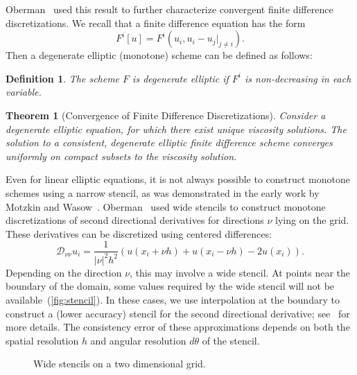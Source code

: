 \documentclass{amsart}
\newtheorem{theorem}{Theorem}
\theoremstyle{lemma}
\newtheorem{definition}{Definition}
\theoremstyle{remark}
\begin{document}
Oberman~\cite{ObermanSINUM} used this result to further characterize convergent finite difference discretizations.
We recall that a finite difference equation has the form
\[ F^i[u] = F^i(u_i,u_i-u_j|_{j \neq i}). \]
Then a degenerate elliptic (monotone) scheme can be defined as follows:
\begin{definition}\label{def:deg}
The scheme $F$ is \emph{degenerate elliptic} if $F^i$ is non-decreasing in each variable.
\end{definition}
\begin{theorem}[Convergence of Finite Difference Discretizations]
Consider a degenerate elliptic equation, for which there exist unique viscosity solutions.  The solution to a consistent, degenerate elliptic finite difference scheme converges uniformly on compact subsets to the viscosity solution.
\end{theorem}

Even for linear elliptic equations, it is not always possible to construct monotone schemes using a narrow stencil, as was demonstrated in the early work by Motzkin and Wasow~\cite{MotzkinWasow}.  Oberman~\cite{ObermanEigenvalues} used wide stencils to construct monotone discretizations of second directional derivatives for directions $\nu$ lying on the grid.  These derivatives can be discretized using centered differences:
\begin{equation}\label{eq:ws} 
{\mathcal{D}}_{\nu\nu}u_i = \frac{1}{{\left\vert{\nu}\right\vert}^2h^2}\left(u(x_i + \nu h) + u(x_i - \nu h) - 2u(x_i)\right). 
\end{equation}
Depending on the direction $\nu$, this may involve a wide stencil.  At points near the boundary of the domain, some values required by the wide stencil will not be available~(\autoref{fig:stencil}).  In these cases, we use interpolation at the boundary to construct a (lower accuracy) stencil for the second directional derivative; see~\cite{ObermanEigenvalues} for more details.  The consistency error of these approximations depends on both the spatial resolution $h$ and angular resolution $d\theta$ of the stencil.

\begin{figure}
  \centering
\vspace*{-12pt}\caption{
Wide stencils on a two dimensional grid.
}
\label{fig:stencil}
\end{figure}
\end{document}
